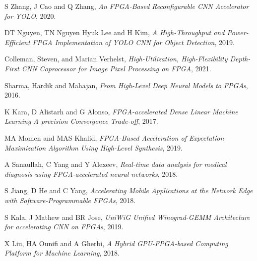 \documentclass[a4paper,12pt,oneside]{book}
\begin{document}
\begin{thebibliography}{li}
S Zhang, J Cao and Q Zhang,
{\em An FPGA-Based Reconfigurable CNN Accelerator for YOLO},
2020.

DT Nguyen, TN Nguyen Hyuk Lee and H Kim,
{\em A High-Throughput and Power-Efficient FPGA Implementation of YOLO CNN for Object Detection},
2019.

Colleman, Steven, and Marian Verhelst,
{\em High-Utilization, High-Flexibility Depth-First CNN Coprocessor for Image Pixel Processing on FPGA},
2021.

Sharma, Hardik and Mahajan,
{\em From High-Level Deep Neural Models to FPGAs},
2016.

K Kara, D Alistarh and G Alonso,
{\em FPGA-accelerated Dense Linear Machine Learning A precision Convergence Trade-off},
2017.

MA Momen and MAS Khalid,
{\em FPGA-Based Acceleration of Expectation Maximization Algorithm Using High-Level Synthesis},
2019.

A Sanaullah, C Yang and Y Alexeev,
{\em Real-time data analysis for medical diagnosis using FPGA-accelerated neural networks},
2018.

S Jiang, D He and C Yang,
{\em Accelerating Mobile Applications at the Network Edge with Software-Programmable FPGAs},
2018.

S Kala, J Mathew and BR Jose,
{\em UniWiG Unified Winograd-GEMM Architecture for accelerating CNN on FPGAs},
2019.

X Liu, HA Ounifi and A Gherbi,
{\em A Hybrid GPU-FPGA-based Computing Platform for Machine Learning},
2018.
\end{thebibliography}
\end{document}
